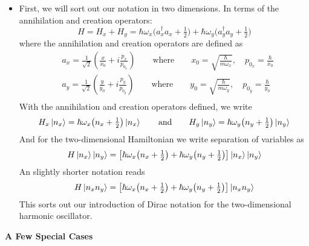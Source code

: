 \documentclass[11pt, a4paper]{article}
\newcommand{\eqtext}[1]{\qquad \text{#1} \qquad}
\begin{document}
\begin{itemize}
	\item First, we will sort out our notation in two dimensions. In terms of the annihilation and creation operators:
	\begin{equation*}
		H = H_{x} + H_{y} = \hbar \omega_{x}\big(a_{x}^{\dagger}a_{x} + \tfrac{1}{2}\big) + \hbar \omega_{y}\big(a_{y}^{\dagger}a_{y} + \tfrac{1}{2}\big)
	\end{equation*}
	where the annihilation and creation operators are defined as
	\begin{align*}
		&a_{x} = \frac{1}{\sqrt{2}}\left(\frac{x}{x_{0}} + i \frac{p_{x}}{p_{0_{x}}}\right) \eqtext{where} x_{0} = \sqrt{\frac{\hbar}{m\omega_{x}}}, \quad p_{0_{x}} = \frac{\hbar}{x_{0}}\\
		&a_{y} = \frac{1}{\sqrt{2}}\left(\frac{y}{y_{0}} + i \frac{p_{y}}{p_{0_{y}}}\right) \eqtext{where} y_{0} = \sqrt{\frac{\hbar}{m\omega_{y}}}, \quad p_{0_{y}} = \frac{\hbar}{y_{0}}\\
	\end{align*}
	With the annihilation and creation operators defined, we write
	\begin{equation*}
		H_{x} \ket{n_{x}} = \hbar \omega_{x} \big(n_{x} + \tfrac{1}{2}\big) \ket{n_{x}} \eqtext{and} H_{y} \ket{n_{y}} = \hbar \omega_{y} \big(n_{y} + \tfrac{1}{2}\big) \ket{n_{y}}
	\end{equation*}
	And for the two-dimensional Hamiltonian we write separation of variables as
	\begin{equation*}
		H\ket{n_{x}} \ket{n_{y}} = \left[\hbar \omega_{x} \big(n_{x} + \tfrac{1}{2}\big) + \hbar \omega_{y} \big(n_{y} + \tfrac{1}{2}\big)\right] \ket{n_{x}} \ket{n_{y}}
	\end{equation*}
	An slightly shorter notation reads
	\begin{equation*}
		H\ket{n_{x}n_{y}} = \left[\hbar \omega_{x} \big(n_{x} + \tfrac{1}{2}\big) + \hbar \omega_{y} \big(n_{y} + \tfrac{1}{2}\big)\right] \ket{n_{x}n_{y}}
	\end{equation*}
	This sorts out our introduction of Dirac notation for the two-dimensional harmonic oscillator. 
\end{itemize}	
	\textbf{A Few Special Cases}
\end{document}
